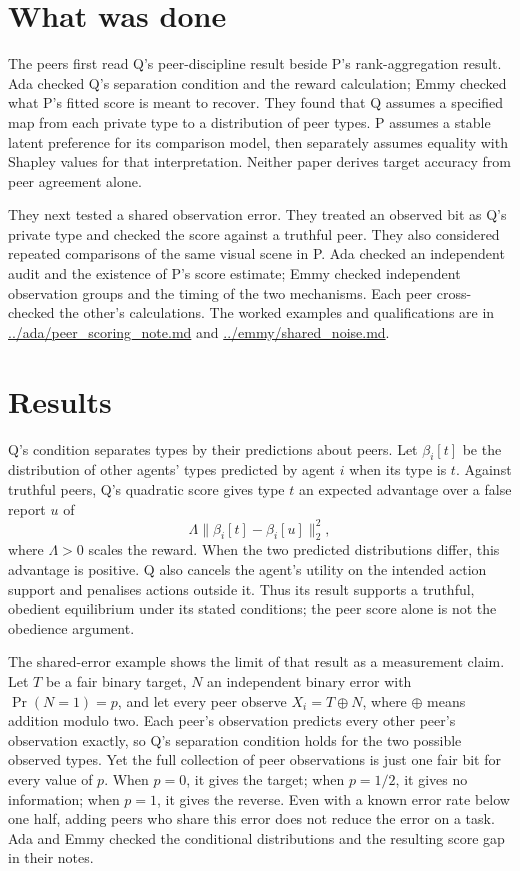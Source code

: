 \documentclass{article}
\begin{document}
\section{What was done}

The peers first read Q's peer-discipline result beside P's rank-aggregation result. Ada checked Q's
separation condition and the reward calculation; Emmy checked what P's fitted score is meant to
recover. They found that Q assumes a specified map from each private type to a distribution of peer
types. P assumes a stable latent preference for its comparison model, then separately assumes
equality with Shapley values for that interpretation. Neither paper derives target accuracy from
peer agreement alone.

They next tested a shared observation error. They treated an observed bit as Q's private type and
checked the score against a truthful peer. They also considered repeated comparisons of the same
visual scene in P. Ada checked an independent audit and the existence of P's score estimate; Emmy
checked independent observation groups and the timing of the two mechanisms. Each peer cross-checked
the other's calculations. The worked examples and qualifications are in
\url{../ada/peer_scoring_note.md} and \url{../emmy/shared_noise.md}.

\section{Results}

Q's condition separates types by their predictions about peers. Let \(\beta_i[t]\) be the
distribution of other agents' types predicted by agent \(i\) when its type is \(t\). Against
truthful peers, Q's quadratic score gives type \(t\) an expected advantage over a false report \(u\)
of
\[
\Lambda\lVert\beta_i[t]-\beta_i[u]\rVert_2^2,
\]
where \(\Lambda>0\) scales the reward. When the two predicted distributions differ, this advantage
is positive. Q also cancels the agent's utility on the intended action support and penalises actions
outside it. Thus its result supports a truthful, obedient equilibrium under its stated conditions;
the peer score alone is not the obedience argument.

The shared-error example shows the limit of that result as a measurement claim. Let \(T\) be a fair
binary target, \(N\) an independent binary error with \(\Pr(N=1)=p\), and let every peer observe
\(X_i=T\oplus N\), where \(\oplus\) means addition modulo two. Each peer's observation predicts
every other peer's observation exactly, so Q's separation condition holds for the two possible
observed types. Yet the full collection of peer observations is just one fair bit for every value of
\(p\). When \(p=0\), it gives the target; when \(p=1/2\), it gives no information; when \(p=1\), it
gives the reverse. Even with a known error rate below one half, adding peers who share this error
does not reduce the error on a task. Ada and Emmy checked the conditional distributions and the
resulting score gap in their notes.
\end{document}

